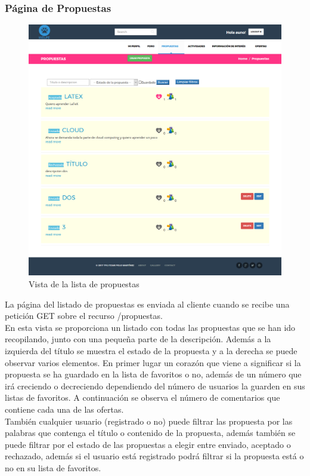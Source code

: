 \subsubsection{Página de Propuestas}
\label{subsubsec:propuestas}
\begin{figure}[H]
\centering
\includegraphics[width=12cm]{img/propuestas}
\caption{Vista de la lista de propuestas}
\label{figura:propuestas}
\end{figure}
La página del listado de propuestas es enviada al cliente cuando se recibe una petición GET sobre el recurso /propuestas.\\
En esta vista se proporciona un listado con todas las propuestas que se han ido recopilando, junto con una pequeña parte de la descripción. Además a la izquierda del título se muestra el estado de la propuesta y a la derecha se puede observar varios elementos. En primer lugar un corazón que viene a significar si la propuesta se ha guardado en la lista de favoritos o no, además de un número que irá creciendo o decreciendo dependiendo del número de usuarios la guarden en sus listas de favoritos. A continuación se observa el número de comentarios que contiene cada una de las ofertas.\\
También cualquier usuario (registrado o no) puede filtrar las propuesta por las palabras que contenga el título o contenido de la propuesta, además también se puede filtrar por el estado de las propuestas a elegir entre enviado, aceptado o rechazado, además si el usuario está registrado podrá filtrar si la propuesta está o no en su lista de favoritos.\\
